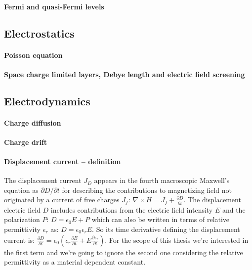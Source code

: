 		\paragraph{Fermi and quasi-Fermi levels}

	\subsection{Electrostatics}

		\paragraph{Poisson equation}
		
		\paragraph{Space charge limited layers, Debye length and electric field screening}\label{intro-space_charge}
		 \cite{WikipediaDebye2019} 
		
			\subsection{Electrodynamics}
		
		\paragraph{Charge diffusion}
		
		\paragraph{Charge drift}
		
		\paragraph{Displacement current -- definition}\label{intro_displacement_current} The displacement current $J_D$ appears in the fourth macroscopic Maxwell's equation as $\partial D / \partial t$ for describing the contributions to magnetizing field not originated by a current of free charges $J_f$: $\nabla \times H = J_f + \frac{\partial D}{\partial t}$.
		The displacement electric field $D$ includes contributions from the electric field intensity $E$ and the polarization $P$: $D=\epsilon_0 E + P$ which can also be written in terms of relative permittivity $\epsilon_r$ as: $D= \epsilon_0 \epsilon_r E$.
		So its time derivative defining the displacement current is: $\frac{\partial D}{\partial t} = \epsilon_0 (\epsilon_r\frac{\partial E}{\partial t} + E\frac{\partial \epsilon_r}{\partial t})$.
		For the scope of this thesis we're interested in the first term and we're going to ignore the second one considering the relative permittivity as a material dependent constant.
		
